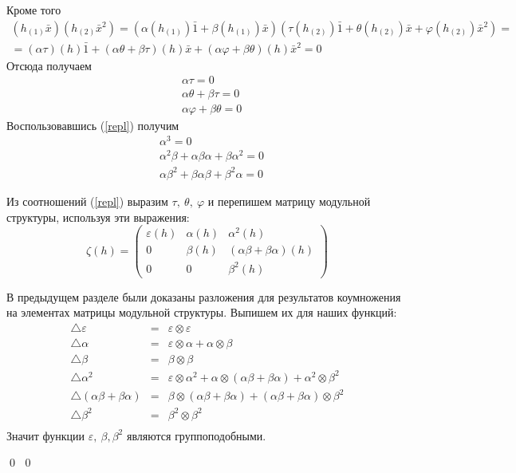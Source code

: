 \documentclass[12pt, reqno, a4paper, oneside, notitlepage]{amsart}
\makeatletter
\theoremstyle{mytheoremstyle}
\theoremstyle{myremarkstyle}
\numberwithin{equation}{section}
\renewenvironment{proof}[1][\proofname]{\par\indent {\bfseries #1\@addpunct{.} }}{\qed}
\makeatother
\begin{document}
\begin{proof}
\begin{proof}
    \noindent Кроме того
    \begin{multline*}
        (h_{(1)}\bar{x})(h_{(2)}\bar{x}^2) = 
        \left( \alpha(h_{(1)}) \bar{1} + \beta(h_{(1)}) \bar{x} \right)
        \left( \tau(h_{(2)}) \bar{1} + \theta(h_{(2)}) \bar{x} + \varphi(h_{(2)}) \bar{x}^2 \right)=
        \\
        = (\alpha\tau)(h) \bar{1}
        +(\alpha\theta + \beta\tau)(h)\bar{x}+(\alpha\varphi + \beta\theta)(h)\bar{x}^2
        =0
    \end{multline*}
    Отсюда получаем
    \begin{align*}
        &\alpha \tau = 0\\
        &\alpha \theta + \beta \tau = 0\\
        &\alpha \varphi + \beta \theta = 0
    \end{align*}
    Воспользовавшись (\ref{repl}) получим
    \begin{align}
        &\alpha^3 = 0 \label{1}\\
        &\alpha^2\beta+\alpha\beta\alpha + \beta\alpha^2 = 0 \label{2}\\
        &\alpha\beta^2+\beta\alpha\beta+\beta^2\alpha = 0 \label{3}
    \end{align}
    
    Из соотношений (\ref{repl}) выразим $\tau,\ \theta,\ \varphi$ и перепишем матрицу модульной структуры, используя эти выражения:
    \[\zeta(h) = 
    \begin{pmatrix}
        \varepsilon(h) & \alpha(h) & \alpha^2(h)\\
         0 & \beta(h) & (\alpha\beta + \beta\alpha)(h) \\
         0 & 0 & \beta^2(h)
    \end{pmatrix}\]

    В предыдущем разделе были доказаны разложения для результатов коумножения на элементах матрицы модульной структуры. Выпишем их для наших функций:
    \begin{eqnarray*}
        \bigtriangleup\varepsilon &=& \varepsilon \otimes \varepsilon\\
        \bigtriangleup\alpha &=& \varepsilon \otimes \alpha + \alpha \otimes \beta\\
        \bigtriangleup\beta &=& \beta \otimes \beta\\
        \bigtriangleup\alpha^2 &=& \varepsilon \otimes \alpha^2 + \alpha \otimes (\alpha\beta+\beta\alpha) + \alpha^2 \otimes \beta^2\\
        \bigtriangleup(\alpha\beta+\beta\alpha) &=& \beta \otimes (\alpha\beta+\beta\alpha) + (\alpha\beta+\beta\alpha)\otimes \beta^2\\
        \bigtriangleup\beta^2 &=& \beta^2 \otimes \beta^2\\
    \end{eqnarray*}
    Значит функции $\varepsilon,\ \beta, \beta^2$ являются группоподобными.


\end{proof}
\end{proof}
\end{document}
